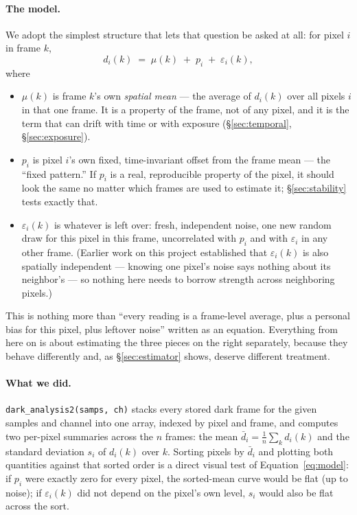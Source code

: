 \documentclass[11pt,a4paper]{article}
\newcommand{\code}[1]{\texttt{#1}}
\begin{document}
\paragraph{The model.}
We adopt the simplest structure that lets that question be asked at all:
for pixel $i$ in frame $k$,
\begin{equation}
d_i(k) \;=\; \mu(k) \;+\; p_i \;+\; \varepsilon_i(k),
\label{eq:model}
\end{equation}
where
\begin{itemize}
\item $\mu(k)$ is frame $k$'s own \emph{spatial mean} --- the average of
  $d_i(k)$ over all pixels $i$ in that one frame. It is a property of the
  frame, not of any pixel, and it is the term that can drift with time or
  with exposure (\S\ref{sec:temporal}, \S\ref{sec:exposure}).
\item $p_i$ is pixel $i$'s own fixed, time-invariant offset from the frame
  mean --- the ``fixed pattern.'' If $p_i$ is a real, reproducible property
  of the pixel, it should look the same no matter which frames are used to
  estimate it; \S\ref{sec:stability} tests exactly that.
\item $\varepsilon_i(k)$ is whatever is left over: fresh, independent noise,
  one new random draw for this pixel in this frame, uncorrelated with
  $p_i$ and with $\varepsilon_i$ in any other frame. (Earlier work on this
  project established that $\varepsilon_i(k)$ is also spatially
  independent --- knowing one pixel's noise says nothing about its
  neighbor's --- so nothing here needs to borrow strength across
  neighboring pixels.)
\end{itemize}
This is nothing more than ``every reading is a frame-level average, plus a
personal bias for this pixel, plus leftover noise'' written as an equation.
Everything from here on is about estimating the three pieces on the right
separately, because they behave differently and, as \S\ref{sec:estimator}
shows, deserve different treatment.

\paragraph{What we did.}
\code{dark\_analysis2(samps, ch)} stacks every stored dark frame for the
given samples and channel into one array, indexed by pixel and frame, and
computes two per-pixel summaries across the $n$ frames: the mean $\bar
d_i = \frac1n\sum_k d_i(k)$ and the standard deviation $s_i$ of $d_i(k)$
over $k$. Sorting pixels by $\bar d_i$ and plotting both quantities against
that sorted order is a direct visual test of Equation~\ref{eq:model}: if
$p_i$ were exactly zero for every pixel, the sorted-mean curve would be
flat (up to noise); if $\varepsilon_i(k)$ did not depend on the pixel's own
level, $s_i$ would also be flat across the sort.
\end{document}
